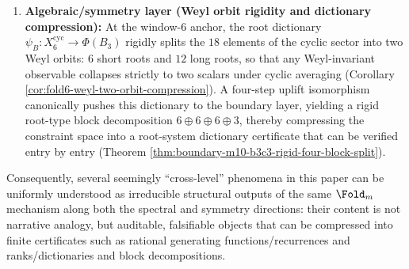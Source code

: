 \begin{enumerate}
  \item \textbf{Algebraic/symmetry layer (Weyl orbit rigidity and dictionary compression):}
  At the window-\(6\) anchor, the root dictionary \(\psi_B:X_6^{\mathrm{cyc}}\to\Phi(B_3)\) rigidly splits the \(18\) elements of the cyclic sector into two Weyl orbits: \(6\) short roots and \(12\) long roots, so that any Weyl-invariant observable collapses strictly to two scalars under cyclic averaging (Corollary \ref{cor:fold6-weyl-two-orbit-compression}).
  A four-step uplift isomorphism canonically pushes this dictionary to the boundary layer, yielding a rigid root-type block decomposition \(6\oplus 6\oplus 6\oplus 3\), thereby compressing the constraint space into a root-system dictionary certificate that can be verified entry by entry (Theorem \ref{thm:boundary-m10-b3c3-rigid-four-block-split}).
\end{enumerate}
Consequently, several seemingly ``cross-level'' phenomena in this paper can be uniformly understood as irreducible structural outputs of the same \(\Fold_m\) mechanism along both the spectral and symmetry directions: their content is not narrative analogy, but auditable, falsifiable objects that can be compressed into finite certificates such as rational generating functions/recurrences and ranks/dictionaries and block decompositions.
